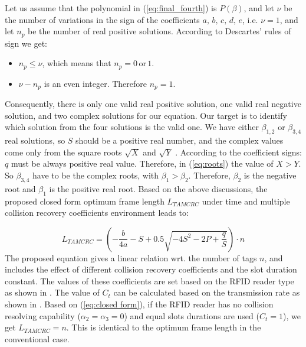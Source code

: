 \documentclass[10pt,conference,letterpaper]{RWWTemplate}
\begin{document}
Let us assume that the polynomial in (\ref{eq:final_fourth}) is $P(\beta)$,
and let $\nu$ be the number of variations in the sign of the coefficients
$a,\, b,\, c,\, d,\, e$, i\@.e\@. $\nu=1$, and let $n_{p}$ be
the number of real positive solutions. According to Descartes\textquoteright{}
rules of sign \cite{Descartes_rule} we get:
\begin{itemize}
\item $n_{p}\leq\nu$, which means that $n_{p}=0\,\textrm{or}\,1$.
\item $\nu-n_{p}$ is an even integer. Therefore $n_{p}=1$.
\end{itemize}
Consequently, there is only one valid real positive solution, one
valid real negative solution, and two complex solutions for our equation.
Our target is to identify which solution from the four solutions is
the valid one. We have either $\beta_{1,2}$ or $\beta_{3,4}$ real
solutions, so $S$ should be a positive real number, and the complex
values come only from the square roots $\sqrt{X}$ and $\sqrt{Y}$
. According to the coefficient signs: $q$ must be always positive
real value. Therefore, in (\ref{eq:roots}) the value of $X>Y$. So
$\beta_{3,4}$ have to be the complex roots, with $\beta_{1}>\beta_{2}$.
Therefore, $\beta_{2}$ is the negative root and $\beta_{1}$ is the
positive real root. Based on the above discussions, the proposed closed
form optimum frame length $L_{TAMCRC}$ under time and multiple collision
recovery coefficients environment leads to:

{\scriptsize{}
\begin{equation}
L_{TAMCRC}=\left(-\frac{b}{4a}-S+0.5\sqrt{-4S^{2}-2P+\frac{q}{S}}\right)\cdot n\label{eq:closed form}
\end{equation}
}The proposed equation gives a linear relation wrt. the number of
tags $n$, and includes the effect of different collision recovery
coefficients and the slot duration constant. The values of these coefficients
are set based on the RFID reader type as shown in \cite{2012_orthogonal_codes}.
The value of $C_{t}$ can be calculated based on the transmission
rate as shown in \cite{Ct_calculation}. Based on (\ref{eq:closed form}),
if the RFID reader has no collision resolving capability ($\alpha_{2}=\alpha_{3}=0$)
and equal slots durations are used ($C_{t}=1$), we get $L_{TAMCRC}=n$.
This is identical to the optimum frame length in the conventional
case. 
%
\end{document}
